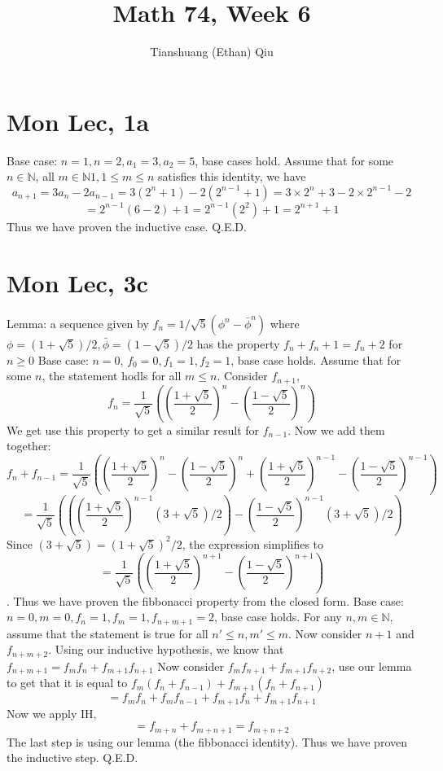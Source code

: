 \documentclass[12pt]{article}
\author{Tianshuang (Ethan) Qiu}
\newcommand{\N}{\mathbb{N}}
\begin{document}
\title{Math 74, Week 6}
\maketitle

\section{Mon Lec, 1a}
Base case: $n=1, n=2, a_1=3, a_2=5$, base cases hold.
\newline
Assume that for some $n \in \N$, all $m \in \N 1, 1 \leq m \leq n$ satisfies this identity, we have
$$a_{n+1}=3a_n-2a_{n-1}=3(2^n+1)-2(2^{n-1}+1)=3\times 2^n+3-2\times 2^{n-1}-2$$
$$=2^{n-1}(6-2)+1=2^{n-1}(2^2)+1=2^{n+1}+1$$
Thus we have proven the inductive case. Q.E.D.

\section{Mon Lec, 3c}
Lemma: a sequence given by $f_n=1/\sqrt5 (\phi^{n} - \bar \phi^{n})$ where $\phi = (1+\sqrt5)/2, \bar \phi = (1-\sqrt5)/2$ has the property $f_n+f_n+1 = f_n+2$ for $n \geq 0$
\newline
Base case: $n = 0$, $f_0 = 0, f_1=1, f_2=1$, base case holds.
Assume that for some $n$, the statement hodls for all $m\leq n$.
\newline
Consider $f_{n+1}$, $$f_n = \frac{1}{\sqrt5}((\frac{1+\sqrt5}{2})^n-(\frac{1-\sqrt5}{2})^n)$$
We get use this property to get a similar result for $f_{n-1}$. Now we add them together:
$$f_n+f_{n-1}=\frac{1}{\sqrt5}((\frac{1+\sqrt5}{2})^n-(\frac{1-\sqrt5}{2})^n+(\frac{1+\sqrt5}{2})^{n-1}-(\frac{1-\sqrt5}{2})^{n-1})$$
$$=\frac{1}{\sqrt5}(((\frac{1+\sqrt5}{2})^{n-1}(3+\sqrt5)/2)-(\frac{1-\sqrt5}{2})^{n-1}(3+\sqrt5)/2)$$
Since $(3+\sqrt5)=(1+\sqrt5)^2/2$, the expression simplifies to
$$=\frac{1}{\sqrt5}((\frac{1+\sqrt5}{2})^{n+1}-(\frac{1-\sqrt5}{2})^{n+1})$$.
Thus we have proven the fibbonacci property from the closed form.
\newline
Base case: $n=0, m=0, f_n=1, f_m=1, f_{n+m+1}=2$, base case holds.
\newline
For any $n, m \in \N$, assume that the statement is true for all $n'\leq n, m' \leq m$. Now consider $n+1$ and $f_{n+m+2}$.
\newline
Using our inductive hypothesis, we know that $f_{n+m+1}=f_mf_n + f_{m+1}f_{n+1}$
\newline
Now consider $f_mf_{n+1}+f_{m+1}f_{n+2}$, use our lemma to get that it is equal to $f_m(f_n+f_{n-1})+f_{m+1}(f_n+f_{n+1})$
$$=f_mf_n+f_mf_{n-1}+f_{m+1}f_n+f_{m+1}f_{n+1}$$
Now we apply IH,
$$=f_{m+n}+f_{m+n+1}=f_{m+n+2}$$
The last step is using our lemma (the fibbonacci identity). Thus we have proven the inductive step. Q.E.D.
\end{document}
